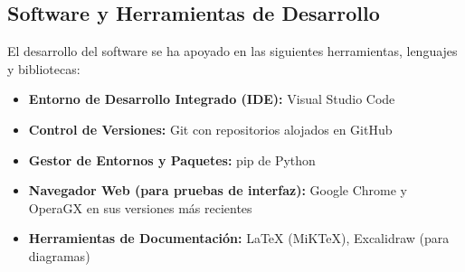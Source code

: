 \subsection{Software y Herramientas de Desarrollo}
El desarrollo del software se ha apoyado en las siguientes herramientas, lenguajes y bibliotecas:
\begin{itemize}
    \item \textbf{Entorno de Desarrollo Integrado (IDE):} Visual Studio Code
    \item \textbf{Control de Versiones:} Git con repositorios alojados en GitHub
    \item \textbf{Gestor de Entornos y Paquetes:} pip de Python
    \item \textbf{Navegador Web (para pruebas de interfaz):} Google Chrome y OperaGX en sus versiones más recientes
    \item \textbf{Herramientas de Documentación:} LaTeX (MiKTeX), Excalidraw (para diagramas)
\end{itemize}